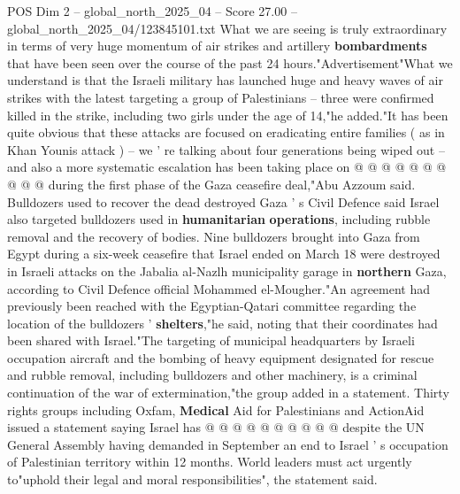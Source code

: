 \begin{textsample}{POS Dim 2 – global\_north\_2025\_04 – Score 27.00 – global\_north\_2025\_04/123845101.txt}
What we are seeing is truly extraordinary in terms of very huge momentum of air strikes and artillery \textbf{bombardments} that have been seen over the course of the past 24 hours."Advertisement"What we understand is that the Israeli military has launched huge and heavy waves of air strikes with the latest targeting a group of Palestinians -- three were confirmed killed in the strike, including two girls under the age of 14,"he added."It has been quite obvious that these attacks are focused on eradicating entire families ( as in Khan Younis attack ) -- we ' re talking about four generations being wiped out -- and also a more systematic escalation has been taking place on @ @ @ @ @ @ @ @ @ @ during the first phase of the Gaza ceasefire deal,"Abu Azzoum said.
Bulldozers used to recover the dead destroyed Gaza ' s Civil Defence said Israel also targeted bulldozers used in \textbf{humanitarian} \textbf{operations}, including rubble removal and the recovery of bodies.
Nine bulldozers brought into Gaza from Egypt during a six-week ceasefire that Israel ended on March 18 were destroyed in Israeli attacks on the Jabalia al-Nazlh municipality garage in \textbf{northern} Gaza, according to Civil Defence official Mohammed el-Mougher."An agreement had previously been reached with the Egyptian-Qatari committee regarding the location of the bulldozers ' \textbf{shelters},"he said, noting that their coordinates had been shared with Israel."The targeting of municipal headquarters by Israeli occupation aircraft and the bombing of heavy equipment designated for rescue and rubble removal, including bulldozers and other machinery, is a criminal continuation of the war of extermination,"the group added in a statement.
Thirty rights groups including Oxfam, \textbf{Medical} Aid for Palestinians and ActionAid issued a statement saying Israel has @ @ @ @ @ @ @ @ @ @ despite the UN General Assembly having demanded in September an end to Israel ' s occupation of Palestinian territory within 12 months.
World leaders must act urgently to"uphold their legal and moral responsibilities", the statement said.

\end{textsample}
